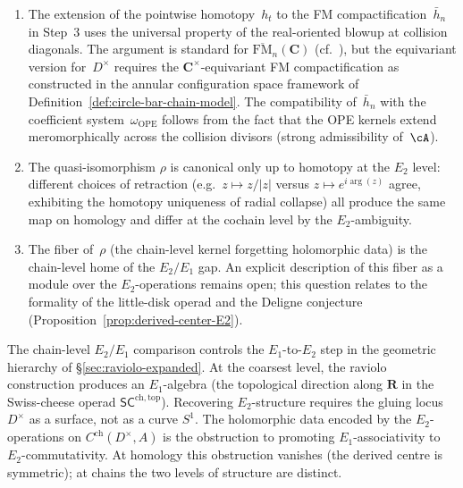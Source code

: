 \begin{remark}%
\label{rem:chain-D-vs-S1-scope}%
\begin{enumerate}[label=\textup{(\alph*)}]
\item The extension of the pointwise homotopy~$h_t$ to
 the FM compactification~$\bar h_n$ in Step~3 uses the
 universal property of the real-oriented blowup at
 collision diagonals. The argument is standard for
 $\overline{\mathrm{FM}}_n(\mathbf{C})$
 (cf.\ \cite{Sinha2004,LV12}), but the equivariant
 version for~$D^\times$ requires the
 $\mathbf{C}^\times$-equivariant FM compactification
 as constructed in the annular configuration space
 framework of
 Definition~\textup{\ref{def:circle-bar-chain-model}}.
 The compatibility of~$\bar h_n$ with the coefficient
 system~$\omega_{\mathrm{OPE}}$ follows from the fact
 that the OPE kernels extend meromorphically across
 the collision divisors (strong admissibility of~$\cA$).
\item The quasi-isomorphism $\rho$ is canonical only up to homotopy at the $E_2$ level: different choices of
 retraction (e.g.\ $z\mapsto z/|z|$ versus
 $z\mapsto e^{i\arg(z)}$ agree, exhibiting the homotopy uniqueness of radial collapse)
 all produce the same map on
 homology and differ at the cochain level by the $E_2$-ambiguity.
\item The fiber of~$\rho$ (the chain-level kernel forgetting holomorphic data) is the chain-level
 home of the $E_2/E_1$ gap. An explicit description of this fiber
 as a module over the $E_2$-operations remains
 open; this question relates to the formality of the
 little-disk operad and the Deligne conjecture
 (Proposition~\textup{\ref{prop:derived-center-E2}}).
\end{enumerate}
\end{remark}

\begin{remark}
\label{rem:E2-E1-ladder}
The chain-level $E_2/E_1$ comparison controls the
$E_1$-to-$E_2$ step in the geometric hierarchy of
\S\ref{sec:raviolo-expanded}.
At the coarsest level, the raviolo construction produces
an $E_1$-algebra (the topological direction along $\mathbf{R}$
in the Swiss-cheese operad $\mathsf{SC}^{\mathrm{ch,top}}$).
Recovering $E_2$-structure requires the gluing locus
$D^\times$ as a surface, not as a curve $S^1$.
The holomorphic data encoded by the $E_2$-operations on
$C^{\mathrm{ch}}(D^\times,A)$ is the obstruction to promoting
$E_1$-associativity to $E_2$-commutativity.
At homology this obstruction vanishes
(the derived centre is symmetric); at chains the two levels
of structure are distinct.
\end{remark}

